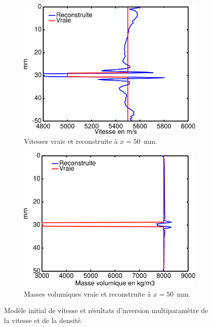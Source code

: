 \begin{figure}[!h]
\begin{subfigure}[b]{0.4\textwidth}
		\includegraphics[width=\textwidth]{img/multi_param/coupe_vp_multi_vert.png}
		\caption{Vitesses vraie et reconstruite à $x=50$~mm.}
	\end{subfigure}
	\begin{subfigure}[b]{0.4\textwidth}
		\includegraphics[width=\textwidth]{img/multi_param/coupe_rho_multi_vert.png}
		\caption{Masses volumiques vraie et reconstruite à $x=50$~mm.}
	\end{subfigure}
	\caption{Modèle initial de vitesse et résultats d'inversion multiparamètre de la vitesse et de la densité.\label{app:inv_multi} }
\end{figure}



